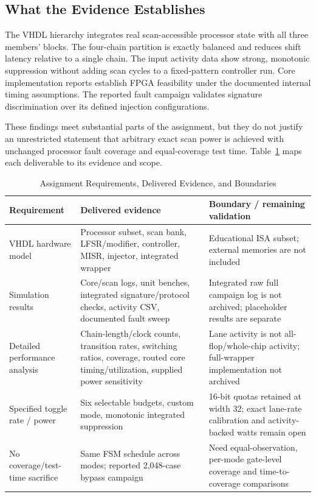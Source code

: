 \documentclass[conference,a4paper]{IEEEtran}
\begin{document}
\subsection{What the Evidence Establishes}
The VHDL hierarchy integrates real scan-accessible processor state with all
three members' blocks. The four-chain partition is exactly balanced and
reduces shift latency relative to a single chain. The input activity data show
strong, monotonic suppression without adding scan cycles to a fixed-pattern
controller run. Core implementation reports establish FPGA feasibility under
the documented internal timing assumptions. The reported fault campaign
validates signature discrimination over its defined injection configurations.

These findings meet substantial parts of the assignment, but they do not
justify an unrestricted statement that arbitrary exact scan power is achieved
with unchanged processor fault coverage and equal-coverage test time.
Table~\ref{tab:requirements} maps each deliverable to its evidence and scope.

\begin{table}[!t]\caption{Assignment Requirements, Delivered Evidence, and Boundaries}
\label{tab:requirements}\centering\small
\begin{tabular}{@{}p{}p{}p{}@{}}\toprule
Requirement & Delivered evidence & Boundary / remaining validation \\\midrule
VHDL hardware model & Processor subset, scan bank, LFSR/modifier, controller, MISR, injector, integrated wrapper & Educational ISA subset; external memories are not included \\
Simulation results & Core/scan logs, unit benches, integrated signature/protocol checks, activity CSV, documented fault sweep & Integrated raw full campaign log is not archived; placeholder results are separate \\
Detailed performance analysis & Chain-length/clock counts, transition rates, switching ratios, coverage, routed core timing/utilization, supplied power sensitivity & Lane activity is not all-flop/whole-chip activity; full-wrapper implementation not archived \\
Specified toggle rate / power & Six selectable budgets, custom mode, monotonic integrated suppression & 16-bit quotas retained at width 32; exact lane-rate calibration and activity-backed watts remain open \\
No coverage/test-time sacrifice & Same FSM schedule across modes; reported 2,048-case bypass campaign & Need equal-observation, per-mode gate-level coverage and time-to-coverage comparisons \\\bottomrule
\end{tabular}
\end{table}
\end{document}
